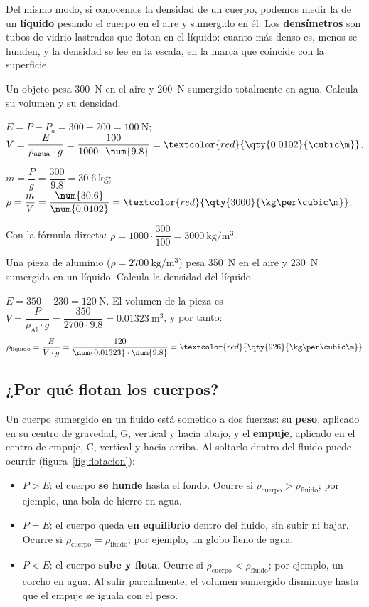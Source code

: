 Del mismo modo, si conocemos la densidad de un cuerpo, podemos medir la de un \textbf{líquido} pesando el cuerpo en el aire y sumergido en él. Los \textbf{densímetros} son tubos de vidrio lastrados que flotan en el líquido: cuanto más denso es, menos se hunden, y la densidad se lee en la escala, en la marca que coincide con la superficie.

\begin{example}
    Un objeto pesa \qty{300}{\newton} en el aire y \qty{200}{\newton} sumergido totalmente en agua. Calcula su volumen y su densidad.

    \(E = P - P_a = 300 - 200 = \qty{100}{\newton}\); \quad \(V = \dfrac{E}{\rho_{\text{agua}} \cdot g} = \dfrac{100}{1000 \cdot \num{9.8}} = \textcolor{red}{\qty{0.0102}{\cubic\m}}\).

    \(m = \dfrac{P}{g} = \dfrac{300}{\num{9.8}} = \qty{30.6}{\kg}\); \quad \(\rho = \dfrac{m}{V} = \dfrac{\num{30.6}}{\num{0.0102}} = \textcolor{red}{\qty{3000}{\kg\per\cubic\m}}\).

    Con la fórmula directa: \(\rho = 1000 \cdot \dfrac{300}{100} = \qty{3000}{\kg\per\cubic\m}\).
\end{example}

\begin{example}
    Una pieza de aluminio (\(\rho = \qty{2700}{\kg\per\cubic\m}\)) pesa \qty{350}{\newton} en el aire y \qty{230}{\newton} sumergida en un líquido. Calcula la densidad del líquido.

    \(E = 350 - 230 = \qty{120}{\newton}\). El volumen de la pieza es \(V = \dfrac{P}{\rho_{\text{Al}} \cdot g} = \dfrac{350}{2700 \cdot \num{9.8}} = \qty{0.01323}{\cubic\m}\), y por tanto:
    \[ \rho_{\text{líquido}} = \frac{E}{V \cdot g} = \frac{120}{\num{0.01323} \cdot \num{9.8}} = \textcolor{red}{\qty{926}{\kg\per\cubic\m}} \]
\end{example}

\subsection{¿Por qué flotan los cuerpos?}

Un cuerpo sumergido en un fluido está sometido a dos fuerzas: su \textbf{peso}, aplicado en su centro de gravedad, G, vertical y hacia abajo, y el \textbf{empuje}, aplicado en el centro de empuje, C, vertical y hacia arriba. Al soltarlo dentro del fluido puede ocurrir (figura~\ref{fig:flotacion}):
\begin{itemize}
    \item \(P > E\): el cuerpo \textbf{se hunde} hasta el fondo. Ocurre si \(\rho_{\text{cuerpo}} > \rho_{\text{fluido}}\); por ejemplo, una bola de hierro en agua.
    \item \(P = E\): el cuerpo queda \textbf{en equilibrio} dentro del fluido, sin subir ni bajar. Ocurre si \(\rho_{\text{cuerpo}} = \rho_{\text{fluido}}\); por ejemplo, un globo lleno de agua.
    \item \(P < E\): el cuerpo \textbf{sube y flota}. Ocurre si \(\rho_{\text{cuerpo}} < \rho_{\text{fluido}}\); por ejemplo, un corcho en agua. Al salir parcialmente, el volumen sumergido disminuye hasta que el empuje se iguala con el peso.
\end{itemize}

